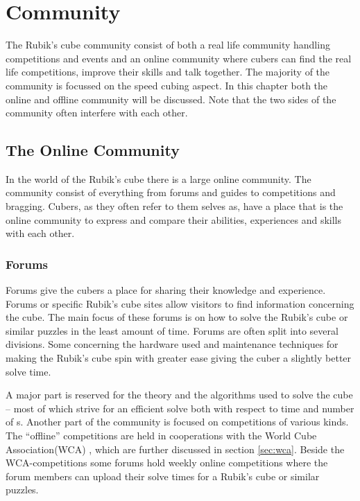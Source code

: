 \chapter{Community}
The Rubik's cube community consist of both a real life community handling competitions and events and an online community where cubers can find the real life competitions, improve their skills and talk together. The majority of the community is focussed on the speed cubing aspect. In this chapter both the online and offline community will be discussed. Note that the two sides of the community often interfere with each other. 

\section{The Online Community}
In the world of the Rubik's cube there is a large online community. The community consist of everything from forums and guides to competitions and bragging. Cubers, as they often refer to them selves as, have a place that is the online community to express and compare their abilities, experiences and skills with each other. 

\subsection{Forums}
Forums give the cubers a place for sharing their knowledge and experience\cite{speedsolving.com}\cite{speedcubing.dk}\cite{wca}. Forums or specific Rubik's cube sites allow visitors to find information concerning the cube. The main focus of these forums is on how to solve the Rubik's cube or similar puzzles in the least amount of time. Forums are often split into several divisions. Some concerning the hardware used and maintenance techniques for making the Rubik's cube spin with greater ease giving the cuber a slightly better solve time.

A major part is reserved for the theory and the algorithms used to solve the cube -- most of which strive for an efficient solve both with respect to time and number of \twist{}s.
Another part of the community is focused on competitions of various kinds. The ``offline'' competitions are held in cooperations with the World Cube Association(WCA) \cite{wca}, which are further discussed in section \ref{sec:wca}. Beside the WCA-competitions some forums hold weekly online competitions where the forum members can upload their solve times for a Rubik's cube or similar puzzles. 

